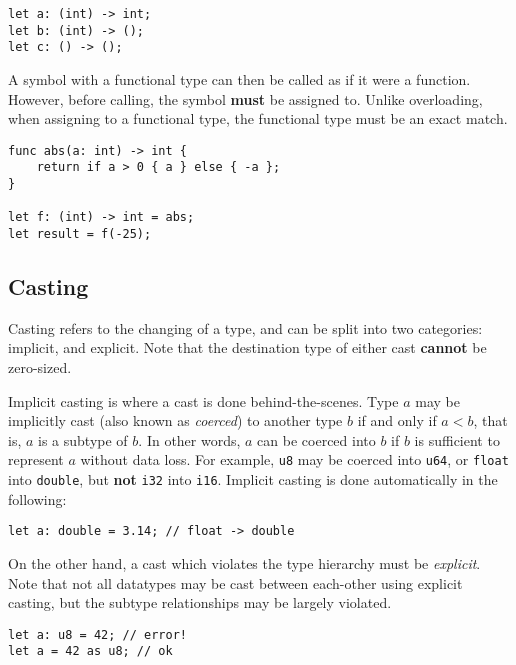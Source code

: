 \begin{lstlisting}[language=CustomLang]
let a: (int) -> int;
let b: (int) -> ();
let c: () -> ();
\end{lstlisting}

A symbol with a functional type can then be called as if it were a function.
However, before calling, the symbol \textbf{must} be assigned to.
Unlike overloading, when assigning to a functional type, the functional type must be an exact match.

\begin{lstlisting}[language=CustomLang]
func abs(a: int) -> int {
    return if a > 0 { a } else { -a };
}

let f: (int) -> int = abs;
let result = f(-25);
\end{lstlisting}

\subsection{Casting}\label{subsec:type-casting}

Casting refers to the changing of a type, and can be split into two categories: implicit, and explicit.
Note that the destination type of either cast \textbf{cannot} be zero-sized.

Implicit casting is where a cast is done behind-the-scenes.
Type \(a\) may be implicitly cast (also known as \textit{coerced}) to another type \(b\) if and only if \(a < b\), that is, \(a\) is a subtype of \(b\).
In other words, \(a\) can be coerced into \(b\) if \(b\) is sufficient to represent \(a\) without data loss.
For example, \texttt{u8} may be coerced into \texttt{u64}, or \texttt{float} into \texttt{double}, but \textbf{not} \texttt{i32} into \texttt{i16}.
Implicit casting is done automatically in the following:

\begin{lstlisting}[language=CustomLang]
let a: double = 3.14; // float -> double
\end{lstlisting}

On the other hand, a cast which violates the type hierarchy must be \textit{explicit}.
Note that not all datatypes may be cast between each-other using explicit casting, but the subtype relationships may be largely violated.

\begin{lstlisting}[language=CustomLang]
let a: u8 = 42; // error!
let a = 42 as u8; // ok
\end{lstlisting}


